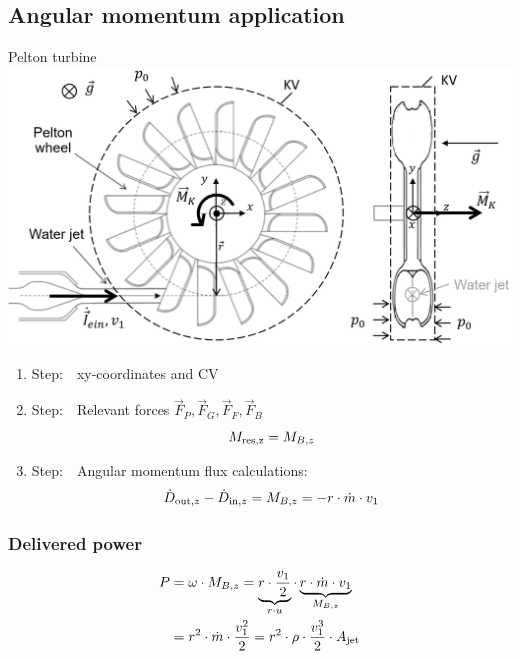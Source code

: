 \documentclass{article}
\begin{document}
\begin{multicols}{2}
\subsection{Angular momentum application}
\begin{examplebox}{Pelton turbine}
        \includegraphics[width=\textwidth]{media/peltonlaufrad_drall_en.png}

        \begin{enumerate}[label=\Roman*]
        \item Step:\ \ xy-coordinates and CV
        \item Step:\ \ Relevant forces $\vec{F}_P,\vec{F}_G,\vec{F}_F,\vec{F}_B$
            \begin{equation}
                M_{\rm res,z} = M_{B,z}
            \end{equation}
        \item Step:\ \ Angular momentum flux calculations:
            \begin{equation}
                \dot{D}_{{\rm out},z} - \dot{D}_{{\rm in},z} = M_{B,z} = -r\cdot \dot{m} \cdot v_1
            \end{equation}
    \end{enumerate}

    \subsubsection{Delivered power}
    \vspace*{-0.3cm}
    \begin{align}
        P&=\omega\cdot M_{B,z} = \underbrace{r\cdot \frac{v_1}{2}}_{r\cdot u}\cdot \underbrace{r\cdot\dot{m}\cdot v_1}_{M_{B,z}} \notag \\
        &= r^2\cdot\dot{m}\cdot\frac{v_1^2}{2} = r^2\cdot \rho \cdot \frac{v_1^3}{2}\cdot A_{\rm jet}
    \end{align}
\end{examplebox}


\end{multicols}
\end{document}

